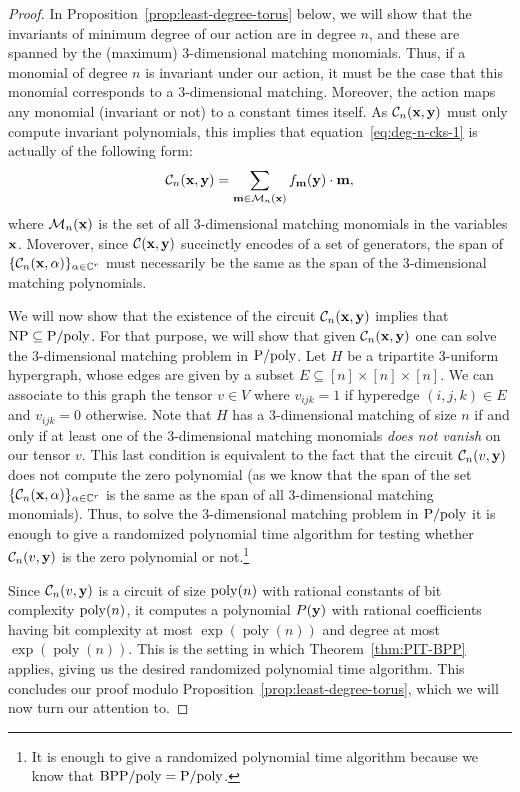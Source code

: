\documentclass[10pt,a4paper]{article}
\newcommand{\C}{\mathbb C}
\newcommand{\cC}{\mathcal C}
\newcommand{\cM}{\mathcal M}
\newcommand{\bbm}{\textbf m}
\newcommand{\bx}{\textbf x}
\newcommand{\by}{\textbf y}
\newcommand{\poly}{\operatorname{poly}}
\begin{document}
\begin{proof}
	In Proposition~\ref{prop:least-degree-torus} below, we will show that the invariants
	of minimum degree of our action are in degree $n$, and these
	are spanned by the (maximum) $3$-dimensional matching monomials.
  Thus, if a monomial of degree $n$ is invariant under our action, it must be the case that this monomial corresponds to a $3$-dimensional matching.
  Moreover, the action maps any monomial (invariant or not) to a constant times itself. 
  As $\cC_n(\bx, \by)$ must only compute invariant polynomials, this
	implies that equation~\eqref{eq:deg-n-cks-1} is actually of the following form:
	\begin{equation}\label{eq:deg-n-cks-2}
		\cC_n(\bx, \by) = \sum_{\bbm \in \cM_n(\bx)}
		f_\bbm(\by) \cdot \bbm,
	\end{equation}
	where $\cM_n(\bx)$ is the set of all $3$-dimensional matching monomials
	in the variables $\bx$.
  Moverover, since $\cC(\bx,\by)$ succinctly encodes of a set of generators, the span of $\{\cC_n(\bx,\alpha)\}_{\alpha\in\C^r}$ must necessarily be the same as the span of the 3-dimensional matching polynomials.

	We will now show that the existence of the circuit $\cC_n(\bx, \by)$ implies that
	${\rm NP\subseteq P/poly}$. For that purpose, we will show that given $\cC_n(\bx, \by)$ one can
	solve the $3$-dimensional matching problem in ${\rm P/poly}$.
	Let $H$ be a tripartite 3-uniform hypergraph, whose edges are given by a subset
	$E \subseteq [n] \times [n] \times [n]$.
	We can associate to this graph the tensor $v \in V$ where
	$v_{ijk} = 1$ if hyperedge $(i,j,k) \in E$ and $v_{ijk} = 0$ otherwise.
	Note that $H$ has a $3$-dimensional matching of size $n$ if and only if at least one
	of the $3$-dimensional matching monomials \emph{does not vanish} on our tensor $v$.
	This last
	condition is equivalent to the fact that the circuit $\cC_n(v, \by)$ does not compute the
	zero polynomial (as we know that the span of the set $\{\cC_n(\bx, \alpha)\}_{\alpha \in \C^r}$
	is the same as the span of all $3$-dimensional matching monomials).
	Thus, to solve the $3$-dimensional
	matching problem in ${\rm P/poly}$ it is enough to give a randomized polynomial time algorithm
	for testing whether $\cC_n(v, \by)$ is the zero polynomial or not.\footnote{It is enough to
	give a randomized polynomial time algorithm because we know that ${\rm BPP/poly = P/poly}$.}

	Since $\cC_n(v, \by)$ is a circuit of size ${\rm poly}(n)$ with rational constants of bit
	complexity ${\rm poly}(n)$, it computes a polynomial $P(\by)$ with rational coefficients
	having bit complexity at most $\exp(\poly(n))$ and degree at most $\exp(\poly(n))$.
  This is the setting in which
	Theorem~\ref{thm:PIT-BPP} applies, giving us the desired randomized polynomial
	time algorithm. This concludes our proof modulo Proposition~\ref{prop:least-degree-torus},
	which we will now turn our attention to.
\end{proof}
\end{document}
